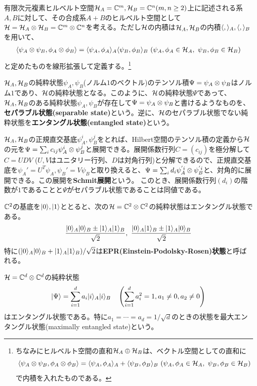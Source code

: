 有限次元複素ヒルベルト空間$\mathcal{H}_A=\mathbb{C}^m, \mathcal{H}_B=\mathbb{C}^n (m,n\geq2)$上に記述される系$A,B$に対して、その合成系$A+B$のヒルベルト空間として$\mathcal{H}=\mathcal{H}_A\otimes \mathcal{H}_B=\mathbb{C}^m\otimes \mathbb{C}^n$を考える。ただし$\mathcal{H}$の内積は$\mathcal{H}_A,\mathcal{H}_B$の内積$\langle,\rangle_A,\langle,\rangle_B$を用いて、
\begin{align}
\la \psi_A\tensor \psi_B, \phi_A\tensor \phi_B\ra = \la\psi_A,\phi_A\ra_A \la\psi_B,\phi_B\ra_B\ (\psi_A,\phi_A\in \HH_A,\ \psi_B,\phi_B\in \HH_B)
\end{align}
と定めたものを線形拡張して定義する。\footnote{ちなみにヒルベルト空間の直和$\mathcal{H}_A\oplus \mathcal{H}_B$は、ベクトル空間としての直和に\[\langle \psi_A\otimes \psi_B, \phi_A\otimes \phi_B\rangle = \langle\psi_A,\phi_A\rangle_A +\langle\psi_B,\phi_B\rangle_B\ (\psi_A,\phi_A\in \mathcal{H}_A,\ \psi_B,\phi_B\in \mathcal{H}_B)\]で内積を入れたものである。
}
\begin{oframed}
$\mathcal{H}_A,\mathcal{H}_B$の純粋状態$\psi_A,\psi_B$(ノルム$1$のベクトル)のテンソル積$\Psi=\psi_A\otimes\psi_B$はノルム$1$であり、$\mathcal{H}$の純粋状態となる。このように、$\mathcal{H}$の純粋状態$\Psi$であって、$\mathcal{H}_A,\mathcal{H}_B$のある純粋状態$\psi_A,\psi_B$が存在して$\Psi=\psi_A\otimes\psi_B$と書けるようなものを、\textbf{セパラブル状態(separable state)}という。逆に、$\mathcal{H}$のセパラブル状態でない純粋状態を\textbf{エンタングル状態(entangled state)}という。
\end{oframed}

$\mathcal{H}_A,\mathcal{H}_B$の正規直交基底$\psi_A^i,\psi_B^j$をとれば、Hilbert空間のテンソル積の定義から$\mathcal{H}$の元を$\Psi=\sum_{i} c_{ij}\psi_A^i \otimes \psi_B^j$と展開できる。展開係数行列$C=(c_{ij})$を極分解して$C=UDV$  ($U,V$はユニタリー行列、$D$は対角行列)と分解できるので、正規直交基底を$\psi_A'=U^T \psi_A, \psi_B'=V\psi_B$と取り換えると、$\Psi=\sum_{i} d_{i}\psi_A^{'i} \otimes \psi_B^{'i}$と、対角的に展開できる。この展開を\textbf{Schmit展開}という。
このとき、展開係数行列$(d_i)$の階数が$1$であることと$\Psi$がセパラブル状態であることは同値である。

\begin{ex}
$\mathbb{C}^2$の基底を$|0\rangle, |1\rangle$ととると、次の$\mathcal{H}=\mathbb{C}^2\otimes\mathbb{C}^2$の純粋状態はエンタングル状態である。
\begin{align}
\frac{|0\ra_A|0\ra_B\pm |1\ra_A|1\ra_B}{\sqrt{2}},\ \frac{|0\ra_A|1\ra_B\pm |1\ra_A|0\ra_B}{\sqrt{2}}
\end{align}
特に$(|0\rangle_A|0\rangle_B+ |1\rangle_A|1\rangle_B)/\sqrt{2}$は\textbf{EPR(Einstein-Podolsky-Rosen)状態}と呼ばれる。
\end{ex}

\begin{ex}\label{generalentangledstate}
$\mathcal{H}=\mathbb{C}^d\otimes \mathbb{C}^d$の純粋状態
\begin{align}
|\Psi\rangle=\sum_{i=1}^d a_i|i\rangle_A |i\rangle_B\quad \left(\sum_{i=1}^d a_i^2=1, a_1\neq 0, a_2\neq 0 \right)
\end{align}
はエンタングル状態である。特に$a_1=\cdots=a_d=1/\sqrt{d}$のときの状態を最大エンタングル状態(maximally entangled state)という。
\end{ex}

